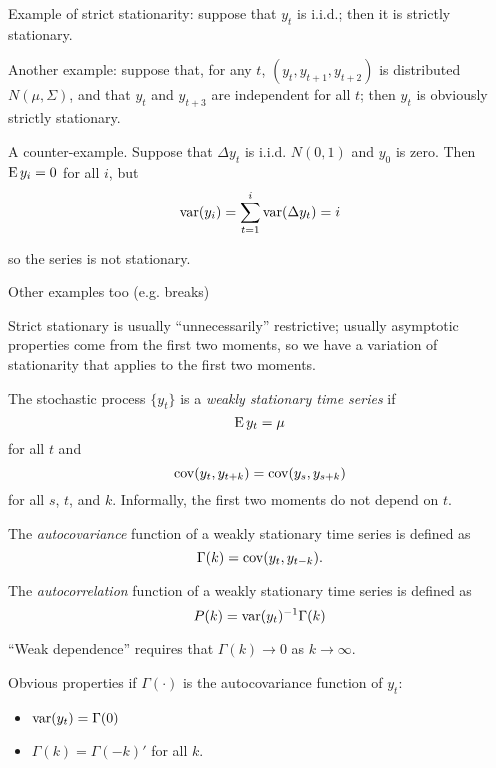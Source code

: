 Example of strict stationarity: suppose that $y_t$ is i.i.d.; then it
is strictly stationary.

Another example: suppose that, for any $t$, $(y_t, y_{t+1}, y_{t+2})$
is distributed $N(\mu,\Sigma)$, and that $y_t$ and $y_{t+3}$ are
independent for all $t$; then $y_t$ is obviously strictly stationary.

A counter-example. Suppose that $\Delta y_t$ is i.i.d. $N(0,1)$ and
$y_0$ is zero. Then $\operatorname{E} y_i = 0$ for all $i$, but
\[\operatorname{var}(y_i) = \sum_{t=1}^i \operatorname{var}(\Delta y_t) = i\]

so the series is not stationary.

Other examples too (e.g. breaks)

Strict stationary is usually ``unnecessarily'' restrictive; usually
asymptotic properties come from the first two moments, so we have a
variation of stationarity that applies to the first two moments.

\begin{defn}
  The stochastic process $\{y_t\}$ is a \emph{weakly stationary time
    series} if
  \begin{equation*}
    \operatorname{E} y_t = \mu
  \end{equation*}
  for all $t$ and
  \begin{equation*}
    \operatorname{cov}(y_t, y_{t+k}) = \operatorname{cov}(y_s, y_{s+k})
  \end{equation*}
  for all $s$, $t$, and $k$.
  Informally, the first two moments do not depend on $t$.
\end{defn}

\begin{defn}
  The \emph{autocovariance} function of a weakly stationary time
  series is defined as
  \begin{equation*}
    \Gamma(k) = \operatorname{cov}(y_t, y_{t-k}).
  \end{equation*}

  The \emph{autocorrelation} function of a weakly stationary time
  series is defined as
  \begin{equation*}
    P(k) = \operatorname{var}(y_t)^{-1} \Gamma(k)
  \end{equation*}
\end{defn}
``Weak dependence'' requires that $\Gamma(k) \to 0$ as $k \to \infty$.

  Obvious properties if $\Gamma(\cdot)$ is the autocovariance function of
  $y_t$:
  \begin{itemize}
  \item $\operatorname{var}(y_t) = \Gamma(0)$
  \item $\Gamma(k) = \Gamma(-k)'$ for all $k$.
  \end{itemize}

